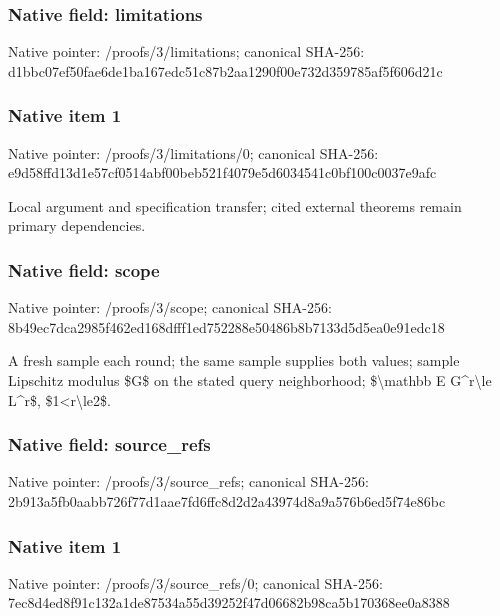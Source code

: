 \documentclass[10pt,a4paper]{article}
\begin{document}
\subsubsection{Native field: limitations}


Native pointer: /proofs/3/limitations; canonical SHA-256: d1bbc07ef50fae6de1ba167e\allowbreak{}dc51c87b2aa1290f00e732d3\allowbreak{}59785af5f606d21c



\subsubsection{Native item 1}


Native pointer: /proofs/3/limitations/0; canonical SHA-256: e9d58ffd13d1e57cf0514abf\allowbreak{}00beb521f4079e5d6034541c\allowbreak{}0bf100c0037e9afc


Local argument and specification transfer; cited external theorems remain primary dependencies.


\subsubsection{Native field: scope}


Native pointer: /proofs/3/scope; canonical SHA-256: 8b49ec7dca2985f462ed168d\allowbreak{}fff1ed752288e50486b8b713\allowbreak{}3d5d5ea0e91edc18


A fresh sample each round; the same sample supplies both values; sample Lipschitz modulus \$G\$ on the stated query neighborhood; \$\textbackslash{}mathbb E G\textasciicircum{}r\textbackslash{}le L\textasciicircum{}r\$, \$1<r\textbackslash{}le2\$.


\subsubsection{Native field: source\_refs}


Native pointer: /proofs/3/source\_refs; canonical SHA-256: 2b913a5fb0aabb726f77d1aa\allowbreak{}e7fd6ffc8d2d2a43974d8a9a\allowbreak{}576b6ed5f74e86bc



\subsubsection{Native item 1}


Native pointer: /proofs/3/source\_refs/0; canonical SHA-256: 7ec8d4ed8f91c132a1de8753\allowbreak{}4a55d39252f47d06682b98ca\allowbreak{}5b170368ee0a8388
\end{document}
